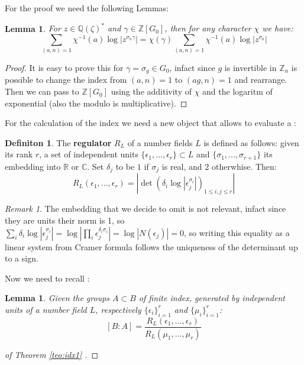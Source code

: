 \documentclass[]{article}
\theoremstyle{plain}
\newtheorem{lem}[teo]{Lemma}
\theoremstyle{remark}
\newtheorem*{rem}{Remark}
\theoremstyle{definition}
\newtheorem{deff}[teo]{Definiton}
\newcommand{\Z}{\mathbb{Z}}
\newcommand{\Q}{\mathbb{Q}}
\newcommand{\C}{\mathbb{C}}
\newcommand{\R}{\mathbb{R}}
\begin{document}
	For the proof we need the following Lemmas:
	
	\begin{lem} \label{lem:fact}
		For $ z \in \Q (\zeta )^\ast  $ and $ \gamma \in \Z [G_0] $, then for any character $\chi$ we have:
		\begin{equation*}
			\sum_{(a,n)=1} \chi ^{-1} (a) \log | z ^{\sigma_a \gamma }| = \chi (\gamma) \sum_{(a,n)=1} \chi ^{-1}(a) \log | z ^{\sigma_a  }|
		\end{equation*}
	\end{lem}
	\begin{proof}
		It is easy to prove this for $\gamma = \sigma_g \in G_0$, infact since $ g $ is invertible in $ \Z_{n} $ is possible to change the index from $ (a,n)=1 $ to $ (ag,n)=1 $ and rearrange. Then we can pass to $ \Z[G_0] $ using the additivity of $ \chi $ and the logaritm of exponential (also the modulo is multiplicative).
	\end{proof}

	For the calculation of the index we need a new object that allows to evaluate a :
	\begin{deff}
		The \textbf{regulator} $ R_L $ of a number fields $ L $ is defined as follows:
		given its rank $ r $, a set of independent units $ \{\epsilon_1 , ... , \epsilon_r\} \subset L$ and $ \{ \sigma_1 , ... , \sigma_{r+1} \} $ its embedding into $ \R $ or $ \C $. Set $ \delta_j $ to be $ 1 $ if $ \sigma_j $ is real, and $ 2 $ otherwhise. \newline
		Then:
		\begin{equation}
			R_L(\epsilon_1 , ... , \epsilon_r) = | \det (\delta_i \log | \epsilon_j ^{\sigma_i}|)_{1\leq i,j\leq r} |
		\end{equation}
	\end{deff}
	
	\begin{rem}
		The embedding that we decide to omit is not relevant, infact since they are units their norm is 1, so $ \sum_i  \delta_i \log | \epsilon_j ^{\sigma_i}| =\log | \prod_i \epsilon_j^{\delta_i \sigma_i }|=\log |N(\epsilon_j)| = 0$, so writing this equality as a linear system from Cramer formula follows the uniqueness of the determinant up to a sign. %
	\end{rem}

	Now we need to recall \cite[Lemma~4.15]{CF}: 
	
	\begin{lem} \label{lem:index_reg}
		Given the groups $ A \subset B $ of finite index, generated by independent units of a number field $ L $, respectively $ \{\epsilon_i\}_{i=1}^r $ and $ \{\mu_i\}_{i=1}^r $:
		\begin{equation} \label{eq:index_reg}
			[B:A]= \frac{R_L(\epsilon_1 , ... , \epsilon_r) }{R_L(\mu_1 , ... , \mu_r) }
		\end{equation}
	\end{lem}
	
	\begin{proof}[of Theorem \ref{teo:idx1} ]
				
	\end{proof}
	\newpage
	\printbibliography
\end{document}
